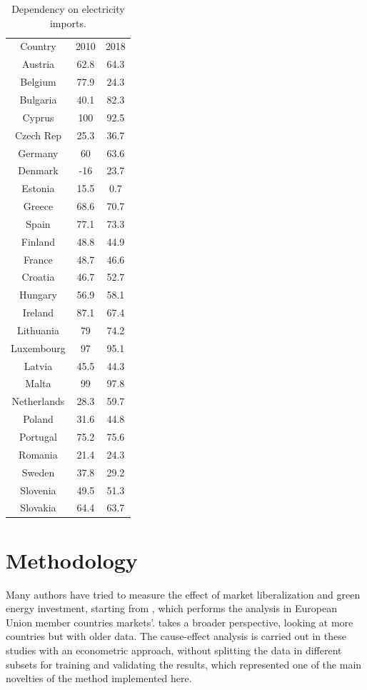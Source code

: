\documentclass{book}
\begin{document}
\bigskip
\begin{table}[H]
\begin{center}
\begin{tabular}{|c|c|c|}
\hline
\rowcolor{lightgray} \multicolumn{3}{|c|}{Electricity Dependence (\%) }\\
\hline
Country & 2010 & 2018 \\
\hline
Austria & 62.8 & 64.3 \\
Belgium & 77.9 & 24.3 \\
Bulgaria & 40.1 & 82.3 \\
Cyprus & 100 & 92.5 \\
Czech Rep & 25.3 & 36.7\\
Germany & 60 & 63.6 \\
Denmark & -16 & 23.7 \\
Estonia & 15.5 & 0.7 \\
Greece & 68.6 & 70.7 \\
Spain & 77.1 &  73.3 \\
Finland & 48.8 & 44.9 \\
France & 48.7 & 46.6 \\
Croatia & 46.7 & 52.7 \\
Hungary &  56.9 & 58.1 \\
Ireland & 87.1 & 67.4 \\
Lithuania & 79 & 74.2 \\
Luxembourg & 97 & 95.1 \\
Latvia & 45.5 & 44.3 \\
Malta & 99 & 97.8 \\
Netherlands & 28.3 & 59.7 \\
Poland & 31.6 & 44.8 \\
Portugal & 75.2 & 75.6 \\
Romania & 21.4 & 24.3 \\
Sweden & 37.8 & 29.2 \\
Slovenia & 49.5 & 51.3 \\
Slovakia & 64.4 & 63.7 \\
\hline
\end{tabular}
\end{center}
\caption{Dependency on electricity imports. }
\end{table}
\bigskip

\chapter{Methodology}

Many authors have tried to measure the effect of market liberalization and green energy investment, starting from \cite{moreno2012electricity}, which performs the analysis in European Union member countries markets'. \cite{nagayama2009electric} takes a broader perspective, looking at more countries but with older data. The cause-effect analysis is carried out in these studies with an econometric approach, without splitting the data in different subsets for training and validating the results, which represented one of the main novelties of the method implemented here.\\
\end{document}
